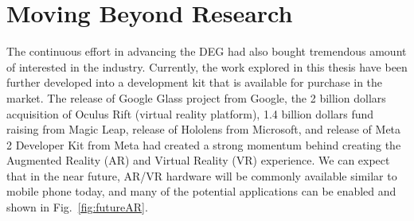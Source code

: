 \section{Moving Beyond Research} 


The continuous effort in advancing the DEG had also bought tremendous amount of interested in the industry. Currently, the work explored in this thesis have been further developed into a development kit that is available for purchase in the market. The release of Google Glass project from Google, the 2 billion dollars acquisition of Oculus Rift (virtual reality platform), 1.4 billion dollars fund raising from Magic Leap, release of Hololens from Microsoft, and release of Meta 2 Developer Kit from Meta had created a strong momentum behind creating the Augmented Reality (AR) and Virtual Reality (VR) experience. We can expect that in the near future, AR/VR hardware will be commonly available similar to mobile phone today, and many of the potential applications can be enabled and shown in Fig.~\ref{fig:futureAR}. 


